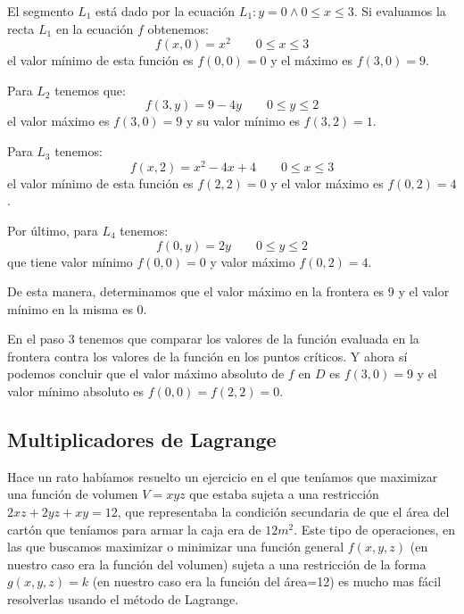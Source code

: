 \documentclass[12pt]{article}
\begin{document}
El segmento $ L_{1} $ está dado por la ecuación $ L_{1}:y=0  \land 0\leq x\leq 3 $. Si evaluamos la recta $ L_{1} $ en la ecuación $ f $ obtenemos:
\[
  f(x,0)=x^2 \qquad 0\leq x\leq 3
\]
el valor mínimo de esta función es $ f(0,0)=0 $ y el máximo es $ f(3,0)=9 $.

Para $ L_{2} $ tenemos que:
\[
  f(3,y)=9-4y \qquad 0\leq y\leq 2
\]
el valor máximo es $ f(3,0)=9 $ y su valor mínimo es $ f(3,2)=1 $.

Para $ L_{3} $ tenemos:
\[
  f(x,2)=x^2-4x+4 \qquad 0\leq x\leq 3
\]
el valor mínimo de esta función es $ f(2,2)=0 $ y el valor máximo es $ f(0,2)=4 $. 

Por último, para $ L_{4} $ tenemos:
\[
  f(0,y)=2y \qquad 0\leq y\leq 2
\]
que tiene valor mínimo $ f(0,0)=0 $ y valor máximo $ f(0,2)=4 $. 

De esta manera, determinamos que el valor máximo en la frontera es 9 y el valor mínimo en la misma es 0.

En el paso 3 tenemos que comparar los valores de la función evaluada en la frontera contra los valores de la función en los puntos críticos. Y ahora sí podemos concluir que el valor máximo absoluto de $ f $ en $ D $ es $ f(3,0)=9 $ y el valor mínimo absoluto es $ f(0,0)=f(2,2)=0 $.

\begin{center}
\end{center}

\subsection{Multiplicadores de Lagrange}
Hace un rato habíamos resuelto un ejercicio en el que teníamos que maximizar una función de volumen $ V = xyz $ que estaba sujeta a una restricción $ 2xz + 2yz + xy = 12 $, que representaba la condición secundaria de que el área del cartón que teníamos para armar la caja era de $ 12m^2 $. Este tipo de operaciones, en las que buscamos maximizar o minimizar una función general $ f(x,y,z) $ (en nuestro caso era la función del volumen) sujeta a una restricción de la forma $ g(x,y,z)=k $ (en nuestro caso era la función del área=12) es mucho mas fácil resolverlas usando el método de Lagrange.
\end{document}

